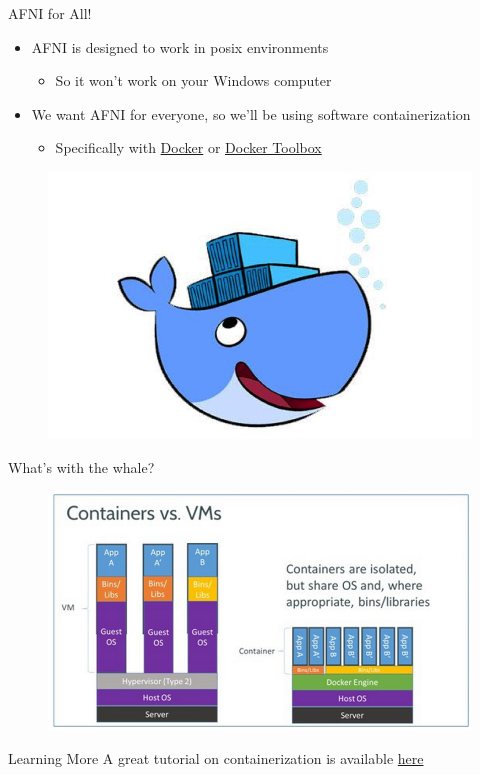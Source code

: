 \documentclass[t,12pt]{beamer}
\begin{document}
\begin{frame}{AFNI for All!}
\vspace{10pt}
\begin{itemize}
\setlength\itemsep{1em}
  \item AFNI is designed to work in posix environments
  \vspace{4pt}
  \begin{itemize}
   \item So it won't work on your Windows computer
  \end{itemize}
  \item We want AFNI for everyone, so we'll be using software containerization
  \vspace{4pt}
  \begin{itemize}
   \item Specifically with \href{https://www.docker.com/products/docker}{Docker} or \href{https://www.docker.com/products/docker-toolbox}{Docker Toolbox} 
  \end{itemize}
\end{itemize}
\begin{figure}
\centering
\includegraphics[width=.4\textwidth]{images/docker_whale.png}
\end{figure}
\end{frame}

\begin{frame}{What's with the whale?}
\begin{figure}
\centering
\includegraphics[width=\textwidth]{images/docker_vs_vm.png}
\end{figure}
\begin{block}{Learning More}
A great tutorial on containerization is available \href{https://www.digitalocean.com/community/tutorials/the-docker-ecosystem-an-overview-of-containerization}{here}
\end{block}
\end{frame}
\end{document}
